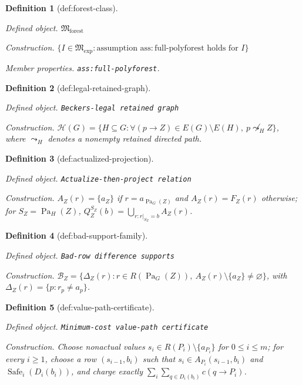 \documentclass{article}
\newtheorem{definition}{Definition}
\begin{document}
\begin{definition}[def:forest-class]\label{def:forest-class}
\par\smallskip\noindent\emph{Defined object.} \(\mathfrak M_{\mathrm{forest}}\)
\par\smallskip\noindent\emph{Construction.} \(\{I\in\mathfrak M_{\mathrm{exp}}:\text{assumption }\mathrm{ass:full\mbox{-}polyforest}\text{ holds for }I\}\)
\par\smallskip\noindent\emph{Member properties.} \texttt{ass:\allowbreak{}full-\allowbreak{}polyforest}.
\end{definition}

\begin{definition}[def:legal-retained-graph]\label{def:legal-retained-graph}
\par\smallskip\noindent\emph{Defined object.} \texttt{Beckers-\allowbreak{}legal retained graph}
\par\smallskip\noindent\emph{Construction.} \(\mathcal H(G)=\{H\subseteq G:\forall(p\to Z)\in E(G)\setminus E(H),\ p\not\leadsto_H Z\}\), where \(\leadsto_H\) denotes a nonempty retained directed path.
\end{definition}

\begin{definition}[def:actualized-projection]\label{def:actualized-projection}
\par\smallskip\noindent\emph{Defined object.} \texttt{Actualize-\allowbreak{}then-\allowbreak{}project relation}
\par\smallskip\noindent\emph{Construction.} \(A_Z(r)=\{a_Z\}\) if \(r=a_{\operatorname{Pa}_G(Z)}\) and \(A_Z(r)=F_Z(r)\) otherwise; for \(S_Z=\operatorname{Pa}_H(Z)\), \(Q_Z^{S_Z}(b)=\bigcup_{r:r|_{S_Z}=b}A_Z(r)\).
\end{definition}

\begin{definition}[def:bad-support-family]\label{def:bad-support-family}
\par\smallskip\noindent\emph{Defined object.} \texttt{Bad-\allowbreak{}row difference supports}
\par\smallskip\noindent\emph{Construction.} \(\mathcal B_Z=\{\Delta_Z(r):r\in R(\operatorname{Pa}_G(Z)),\ A_Z(r)\setminus\{a_Z\}\ne\varnothing\}\), with \(\Delta_Z(r)=\{p:r_p\ne a_p\}\).
\end{definition}

\begin{definition}[def:value-path-certificate]\label{def:value-path-certificate}
\par\smallskip\noindent\emph{Defined object.} \texttt{Minimum-\allowbreak{}cost value-\allowbreak{}path certificate}
\par\smallskip\noindent\emph{Construction.} Choose nonactual values \(s_i\in R(P_i)\setminus\{a_{P_i}\}\) for \(0\le i\le m\); for every \(i\ge1\), choose a row \((s_{i-1},b_i)\) such that \(s_i\in A_{P_i}(s_{i-1},b_i)\) and \(\operatorname{Safe}_i(D_i(b_i))\), and charge exactly \(\sum_i\sum_{q\in D_i(b_i)}c(q\to P_i)\).
\end{definition}
\end{document}
